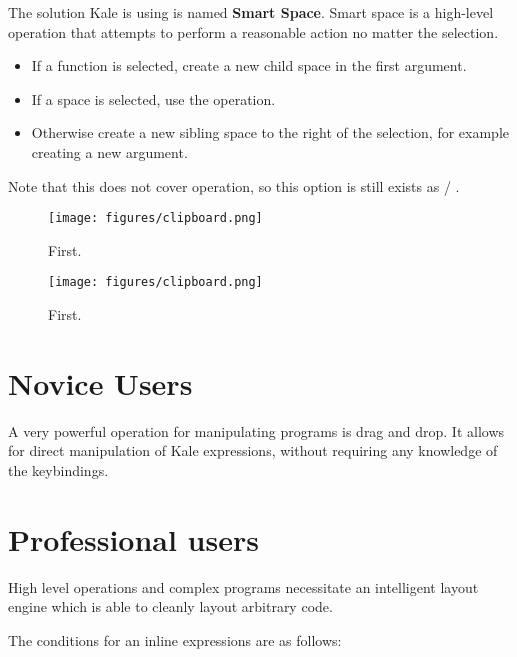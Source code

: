 \documentclass[11pt]{report}
\begin{document}
The solution Kale is using is named \textbf{Smart Space}. Smart space is a
high-level operation that attempts to perform a reasonable action no matter the
selection.
\begin{itemize}[noitemsep]
	\item If a function is selected, create a new child space in the first
argument.
	\item If a space is selected, use the \hyperref[cmd:up_down]{}
	 operation.
	\item Otherwise create a new sibling space to the right of the selection, for
example creating a new argument.
\end{itemize}

Note that this does not cover  operation, so this option
is still exists as
\hyperref[cmd:new_line]{}  /
\hyperref[cmd:new_line]{} .

\begin{figure}
	\begin{minipage}{0.5\linewidth}
	\centering
	\texttt{[image: figures/clipboard.png]}
	\caption{First.}
	\end{minipage}
	\qquad
	\begin{minipage}{0.5\linewidth}
	\centering
	\texttt{[image: figures/clipboard.png]}
	\caption{First.}
	\end{minipage}
\end{figure}

\section{Novice Users}
A very powerful operation for manipulating programs is drag and drop. It allows
for direct manipulation of Kale expressions, without requiring any knowledge of
the keybindings.

\section{Professional users}


High level operations and complex programs necessitate an intelligent layout
engine which is able to cleanly layout arbitrary code.

The conditions for an inline expressions are as follows:
\end{document}
